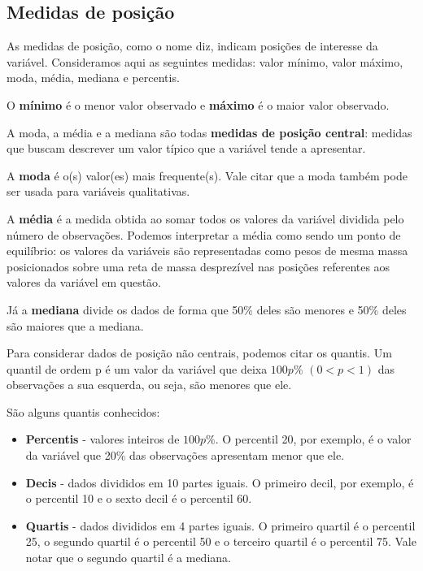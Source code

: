 \documentclass[
]{book}
\begin{document}
\hypertarget{medidas-de-posiuxe7uxe3o}{%
\subsection{Medidas de posição}\label{medidas-de-posiuxe7uxe3o}}

As medidas de posição, como o nome diz, indicam posições de interesse da variável. Consideramos aqui as seguintes medidas: valor mínimo, valor máximo, moda, média, mediana e percentis.

O \textbf{mínimo} é o menor valor observado e \textbf{máximo} é o maior valor observado.

A moda, a média e a mediana são todas \textbf{medidas de posição central}: medidas que buscam descrever um valor típico que a variável tende a apresentar.

A \textbf{moda} é o(s) valor(es) mais frequente(s). Vale citar que a moda também pode ser usada para variáveis qualitativas.

A \textbf{média} é a medida obtida ao somar todos os valores da variável dividida pelo número de observações. Podemos interpretar a média como sendo um ponto de equilíbrio: os valores da variáveis são representadas como pesos de mesma massa posicionados sobre uma reta de massa desprezível nas posições referentes aos valores da variável em questão.

Já a \textbf{mediana} divide os dados de forma que 50\% deles são menores e 50\% deles são maiores que a mediana.

Para considerar dados de posição não centrais, podemos citar os quantis. Um quantil de ordem p é um valor da variável que deixa \(100p\%\) \((0 < p < 1)\) das observações a sua esquerda, ou seja, são menores que ele.

São alguns quantis conhecidos:

\begin{itemize}
\item
  \textbf{Percentis} - valores inteiros de \(100p\%\). O percentil 20, por exemplo, é o valor da variável que 20\% das observações apresentam menor que ele.
\item
  \textbf{Decis} - dados divididos em 10 partes iguais. O primeiro decil, por exemplo, é o percentil 10 e o sexto decil é o percentil 60.
\item
  \textbf{Quartis} - dados divididos em 4 partes iguais. O primeiro quartil é o percentil 25, o segundo quartil é o percentil 50 e o terceiro quartil é o percentil 75.
  Vale notar que o segundo quartil é a mediana.
\end{itemize}
\end{document}
